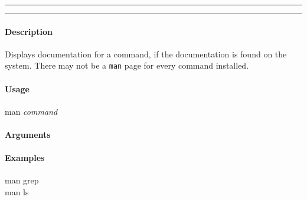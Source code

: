 \hrule
\vspace{1mm}
\hrule
\vspace{4mm}

\paragraph{Description}
\indentpar \raggedright \textrm{Displays documentation for a command, if the documentation is found on the system. There may not be a \texttt{man} page for every command installed.}\\

\paragraph{Usage}
\indentpar man \textit{command}

\paragraph{Arguments}
\indentpar {}

\paragraph{Examples}

\indentpar man grep\\
\indentpar man ls

\vspace{20mm}